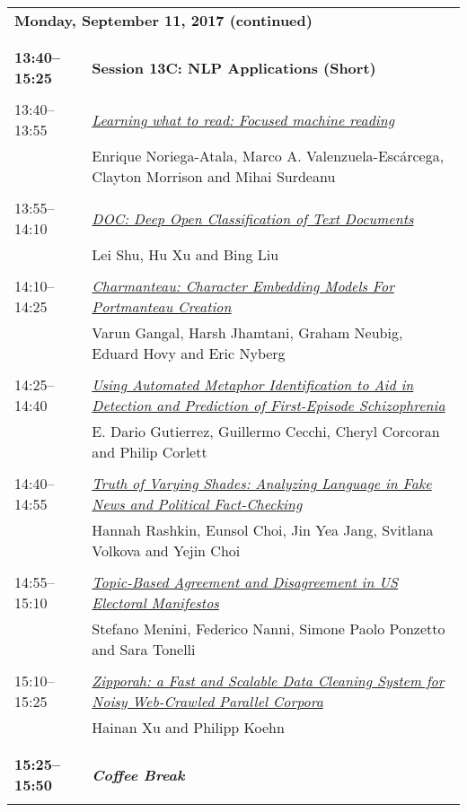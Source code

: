 \begin{tabular}{p{20mm}p{128mm}}
\\
\multicolumn{2}{l}{\bf Monday, September 11, 2017 (continued)} \\\\
\\{\bf 13:40--15:25} & {\bf Session 13C: NLP Applications (Short) } \\
\\
13:40--13:55 & \hyperlink{page.2888}{\em Learning what to read: Focused machine reading}\\
         & Enrique Noriega-Atala, Marco A. Valenzuela-Esc\'{a}rcega, Clayton Morrison and Mihai Surdeanu \\
\\

13:55--14:10 & \hyperlink{page.2894}{\em DOC: Deep Open Classification of Text Documents}\\
         & Lei Shu, Hu Xu and Bing Liu \\
\\

14:10--14:25 & \hyperlink{page.2900}{\em Charmanteau: Character Embedding Models For Portmanteau Creation}\\
         & Varun Gangal, Harsh Jhamtani, Graham Neubig, Eduard Hovy and Eric Nyberg \\
\\

14:25--14:40 & \hyperlink{page.2906}{\em Using Automated Metaphor Identification to Aid in Detection and Prediction of First-Episode Schizophrenia}\\
         & E. Dario Gutierrez, Guillermo Cecchi, Cheryl Corcoran and Philip Corlett \\
\\

14:40--14:55 & \hyperlink{page.2914}{\em Truth of Varying Shades: Analyzing Language in Fake News and Political Fact-Checking}\\
         & Hannah Rashkin, Eunsol Choi, Jin Yea Jang, Svitlana Volkova and Yejin Choi \\
\\

14:55--15:10 & \hyperlink{page.2921}{\em Topic-Based Agreement and Disagreement in US Electoral Manifestos}\\
         & Stefano Menini, Federico Nanni, Simone Paolo Ponzetto and Sara Tonelli \\
\\

15:10--15:25 & \hyperlink{page.2928}{\em Zipporah: a Fast and Scalable Data Cleaning System for Noisy Web-Crawled Parallel Corpora}\\
         & Hainan Xu and Philipp Koehn \\
\\

\\{\bf 15:25--15:50} & {\bf\em Coffee Break} \\
\\
\end{tabular}
